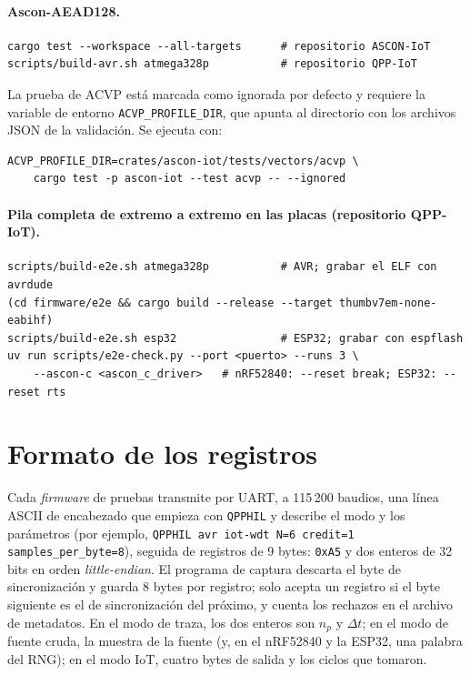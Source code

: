 \paragraph{Ascon-AEAD128.}
\begin{lstlisting}
cargo test --workspace --all-targets      # repositorio ASCON-IoT
scripts/build-avr.sh atmega328p           # repositorio QPP-IoT
\end{lstlisting}

La prueba de ACVP está marcada como ignorada por defecto y requiere la variable de entorno \texttt{ACVP\_PROFILE\_DIR}, que apunta al directorio con los archivos JSON de la validación. Se ejecuta con:

\begin{lstlisting}
ACVP_PROFILE_DIR=crates/ascon-iot/tests/vectors/acvp \
    cargo test -p ascon-iot --test acvp -- --ignored
\end{lstlisting}

\paragraph{Pila completa de extremo a extremo en las placas (repositorio QPP-IoT).}
\begin{lstlisting}
scripts/build-e2e.sh atmega328p           # AVR; grabar el ELF con avrdude
(cd firmware/e2e && cargo build --release --target thumbv7em-none-eabihf)
scripts/build-e2e.sh esp32                # ESP32; grabar con espflash
uv run scripts/e2e-check.py --port <puerto> --runs 3 \
    --ascon-c <ascon_c_driver>   # nRF52840: --reset break; ESP32: --reset rts
\end{lstlisting}

\section{Formato de los registros}

Cada \textit{firmware} de pruebas transmite por UART, a 115\,200 baudios, una línea ASCII de encabezado que empieza con \texttt{QPPHIL} y describe el modo y los parámetros (por ejemplo, \texttt{QPPHIL avr iot-wdt N=6 credit=1 samples\_per\_byte=8}), seguida de registros de 9 bytes: \texttt{0xA5} y dos enteros de 32 bits en orden \textit{little-endian}. El programa de captura descarta el byte de sincronización y guarda 8 bytes por registro; solo acepta un registro si el byte siguiente es el de sincronización del próximo, y cuenta los rechazos en el archivo de metadatos. En el modo de traza, los dos enteros son $n_p$ y $\Delta t$; en el modo de fuente cruda, la muestra de la fuente (y, en el nRF52840 y la ESP32, una palabra del RNG); en el modo IoT, cuatro bytes de salida y los ciclos que tomaron.

